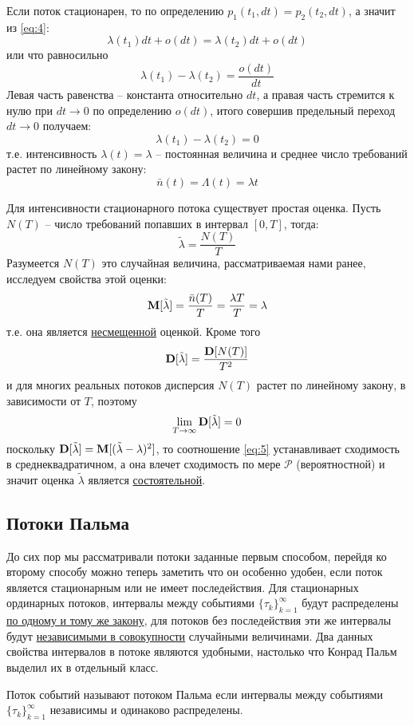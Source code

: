 Если поток стационарен, то по определению $p_1 (t_1, dt) = p_2 (t_2, dt)$, а значит из \eqref{eq:4}:
$$\lambda(t_1) dt + o(dt) = \lambda(t_2) dt + o(dt)$$
или что равносильно
$$\lambda(t_1) - \lambda(t_2) = \frac{o(dt)}{dt}$$
Левая часть равенства -- константа относительно $dt$, а правая часть стремится к нулю при $dt \to 0$ по определению $o(dt)$, итого совершив предельный переход $dt \to 0$ получаем:
$$\lambda(t_1) - \lambda(t_2) = 0$$
т.е. интенсивность $\lambda(t) = \lambda$ -- постоянная величина и среднее число требований растет по линейному закону:
$$\bar{n}(t) = \Lambda(t) = \lambda t$$

Для интенсивности стационарного потока существует простая оценка. Пусть $N(T)$ -- число требований попавших в интервал $[0, T]$, тогда:
$$\tilde{\lambda} = \frac{N(T)}{T}$$
Разумеется $N(T)$ это случайная величина, рассматриваемая нами ранее, исследуем свойства этой оценки:
$$\mathbf{M}[\tilde{\lambda}]= \frac{\bar{n}(T)}{T} = \frac{\lambda T}{T} = \lambda$$
т.е. она является \underline{несмещенной} оценкой. Кроме того
$$\mathbf{D}[\tilde{\lambda}] = \frac{\mathbf{D}[N(T)]}{T^2}$$
и для многих реальных потоков дисперсия $N(T)$ растет по линейному закону, в зависимости от $T$, поэтому
\begin{equation}\label{eq:5}
	\lim_{T \to \infty}{\mathbf{D}[\tilde{\lambda}]} = 0
\end{equation}
поскольку $\mathbf{D}[\tilde{\lambda}] = \mathbf{M}[(\tilde{\lambda} - \lambda)^2]$, то соотношение \eqref{eq:5} устанавливает сходимость в среднеквадратичном, а она влечет сходимость по мере $\mathcal{P}$ (вероятностной) и значит оценка $\tilde{\lambda}$ является \underline{состоятельной}.

\subsection{Потоки Пальма}

До сих пор мы рассматривали потоки заданные первым способом, перейдя ко второму способу можно теперь заметить что он особенно удобен, если поток является стационарным или не имеет последействия. Для стационарных ординарных потоков, интервалы между событиями $\{\tau_k\}_{k=1}^\infty$ будут распределены \underline{по одному и тому же закону}, для потоков без последействия эти же интервалы будут \underline{независимыми в совокупности} случайными величинами. Два данных свойства интервалов в потоке являются удобными, настолько что Конрад Пальм выделил их в отдельный класс.

\begin{definition}
	Поток событий называют {\color{red}потоком Пальма} если интервалы между событиями $\{\tau_k\}_{k=1}^\infty$ независимы и одинаково распределены.
\end{definition}


